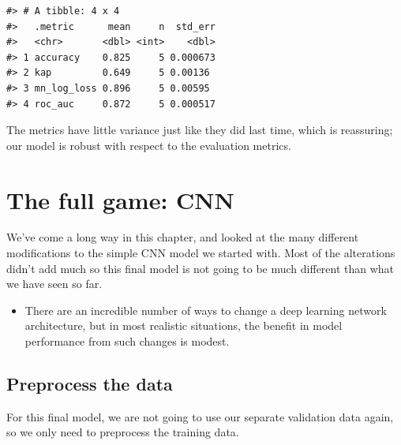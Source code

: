 \documentclass[
]{krantz}
\newenvironment{rmdblock}[1]
  {\begin{shaded*}
  \begin{itemize}[left = -1cm, labelsep = 1cm]
  \renewcommand{\labelitemi}{
    \raisebox{-.7\height}[0pt][0pt]{
      {\setkeys{Gin}{width=3em,keepaspectratio}\texttt{[image: images/\#1]}}
    }
  }
 
  \item
  }
  {
  \end{itemize}
  \end{shaded*}
  }
\newenvironment{rmdwarning}
  {\begin{rmdblock}{warning}}
  {\end{rmdblock}}
\begin{document}
\begin{verbatim}
#> # A tibble: 4 x 4
#>   .metric      mean     n  std_err
#>   <chr>       <dbl> <int>    <dbl>
#> 1 accuracy    0.825     5 0.000673
#> 2 kap         0.649     5 0.00136 
#> 3 mn_log_loss 0.896     5 0.00595 
#> 4 roc_auc     0.872     5 0.000517
\end{verbatim}

The metrics have little variance just like they did last time, which is reassuring; our model is robust with respect to the evaluation metrics.

\hypertarget{cnnfull}{%
\section{The full game: CNN}\label{cnnfull}}

We've come a long way in this chapter, and looked at the many different modifications to the simple CNN model we started with. Most of the alterations didn't add much so this final model is not going to be much different than what we have seen so far.


\begin{rmdwarning}
There are an incredible number of ways to change a deep learning network
architecture, but in most realistic situations, the benefit in model
performance from such changes is modest.
\end{rmdwarning}

\hypertarget{cnnfullpreprocess}{%
\subsection{Preprocess the data}\label{cnnfullpreprocess}}

For this final model, we are not going to use our separate validation data again, so we only need to preprocess the training data.
\end{document}
